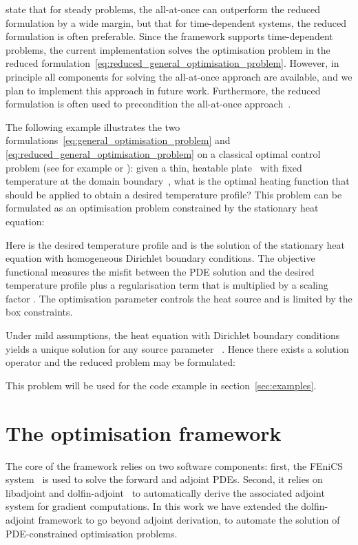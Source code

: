 \documentclass[prodmode,acmtoms]{acmsmall}
\newcommand{\fenics}{{\mbox{FEniCS}}\xspace}
\newcommand{\da}{\mbox{{dolfin-adjoint}}\xspace}
\newcommand{\libadjoint}{\mbox{{libadjoint}}\xspace}
\begin{document}
 state that for steady problems, the all-at-once can outperform the reduced formulation by a wide margin, but that for time-dependent systems, the reduced formulation
is often preferable. Since the framework supports time-dependent problems, the current implementation solves the optimisation problem in the reduced formulation~\eqref{eq:reduced_general_optimisation_problem}.  However, in principle all components for solving the all-at-once approach are available, and we plan to implement this approach in future work. 
Furthermore, the reduced formulation is often used to precondition the all-at-once approach~\cite{biros2000}.

The following example illustrates the two formulations~\eqref{eq:general_optimisation_problem} and \eqref{eq:reduced_general_optimisation_problem} on a classical optimal control problem (see for example  or ): 
given a thin, heatable plate~ with fixed temperature at the domain boundary~, what is the optimal heating function that should be applied to obtain a desired temperature 
profile?
This problem can be formulated as an optimisation problem constrained by the stationary heat equation:


Here  is the desired temperature profile and  is the solution of the stationary heat equation with homogeneous Dirichlet boundary conditions.
The objective functional measures the misfit between the PDE solution and the desired temperature profile plus a regularisation term that is multiplied by a scaling factor . 
The optimisation parameter  controls the heat source and is limited by the box constraints.

Under mild assumptions, the heat equation with Dirichlet boundary conditions yields a unique solution for any source parameter ~\cite[\S 1.3.1.1]{hinze2009}.
Hence there exists a solution operator  and the reduced problem may be formulated:

This problem will be used for the code example in section~\ref{sec:examples}.




\section{The optimisation framework}\label{sec:the_optimisation_framework}


The core of the framework relies on two software components: 
first, the \fenics system~\cite{logg2011,logg2007a} is used to solve the forward and adjoint PDEs.
Second, it relies on \libadjoint and \da~\cite{farrell2012} to automatically derive the associated adjoint system for gradient computations.
In this work we have extended the \da framework to go beyond adjoint derivation, to automate the solution of PDE-constrained optimisation problems.
\end{document}
